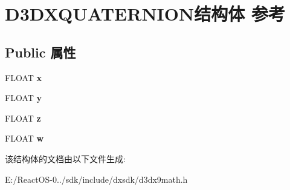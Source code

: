 \hypertarget{struct_d3_d_x_q_u_a_t_e_r_n_i_o_n}{}\section{D3\+D\+X\+Q\+U\+A\+T\+E\+R\+N\+I\+O\+N结构体 参考}
\label{struct_d3_d_x_q_u_a_t_e_r_n_i_o_n}
\subsection*{Public 属性}
\begin{DoxyCompactItemize}
\item 
\mbox{\label{struct_d3_d_x_q_u_a_t_e_r_n_i_o_n_a44fc3afb128091d3d237e4a02766f28c}} 
F\+L\+O\+AT {\bfseries x}
\item 
\mbox{\label{struct_d3_d_x_q_u_a_t_e_r_n_i_o_n_ab19caa45705bafc23070818b21a2526b}} 
F\+L\+O\+AT {\bfseries y}
\item 
\mbox{\label{struct_d3_d_x_q_u_a_t_e_r_n_i_o_n_ae0a7c93136d8242a6a8f5bee2560b3b2}} 
F\+L\+O\+AT {\bfseries z}
\item 
\mbox{\label{struct_d3_d_x_q_u_a_t_e_r_n_i_o_n_a636a47074911406930b835b05d2faeab}} 
F\+L\+O\+AT {\bfseries w}
\end{DoxyCompactItemize}


该结构体的文档由以下文件生成\+:\begin{DoxyCompactItemize}
\item 
E\+:/\+React\+O\+S-\/0../sdk/include/dxsdk/d3dx9math.\+h\end{DoxyCompactItemize}
